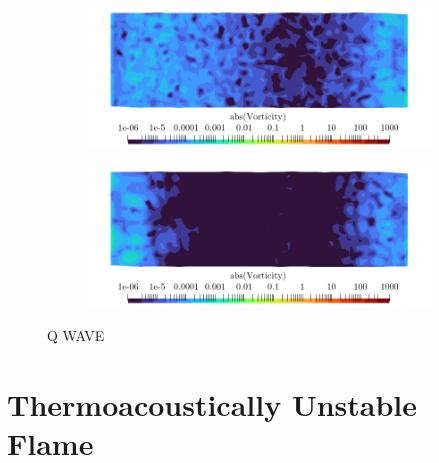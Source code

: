 \begin{figure}[t]
    \begin{subfigure}{0.49\textwidth}
    \centering
    \includegraphics[scale=0.325]{assets/graphs/double-instab.0005.png}
    \caption{}
    \label{fig:qwave3}
    \end{subfigure}
    \begin{subfigure}{0.49\textwidth}
    \centering
    \includegraphics[scale=0.325]{assets/graphs/double-instab.0006.png}
    \caption{}
    \label{fig:qwave4}
    \end{subfigure}
\caption{Q WAVE}
\label{fig:qwave}
\end{figure}







\section{Thermoacoustically Unstable Flame}

